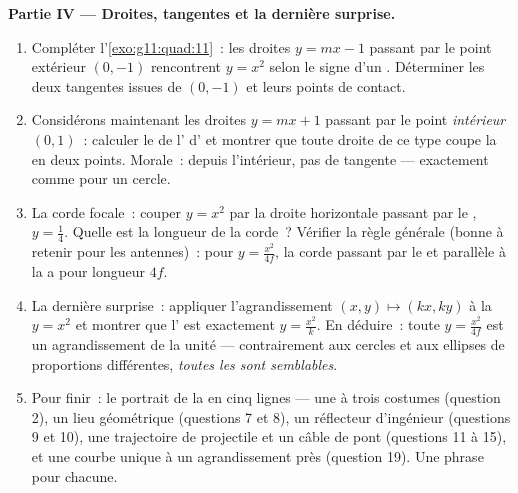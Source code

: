 \begin{problem}
\medskip
\noindent\textbf{Partie IV --- Droites, tangentes et la dernière
surprise.}
\begin{enumerate}[resume]
  \item Compléter l'\cref{exo:g11:quad:11}~: les droites
        $y = mx - 1$ passant par le point extérieur $(0, -1)$
        rencontrent $y = x^2$ selon le signe d'un .
        Déterminer les deux tangentes issues de $(0, -1)$ et leurs
        points de contact.
  \item Considérons maintenant les droites $y = mx + 1$ passant par
        le point \emph{intérieur} $(0, 1)$~: calculer le
         de l' d' et montrer que
        toute droite de ce type coupe la  en deux points.
        Morale~: depuis l'intérieur, pas de tangente --- exactement
        comme pour un cercle.
  \item La corde focale~: couper $y = x^2$ par la droite
        horizontale passant par le , $y = \frac14$. Quelle est
        la longueur de la corde~? Vérifier la règle générale (bonne
        à retenir pour les antennes)~: pour $y = \frac{x^2}{4f}$, la
        corde passant par le  et parallèle à la  a
        pour longueur $4f$.
  \item La dernière surprise~: appliquer l'agrandissement
        $(x, y) \mapsto (kx, ky)$ à la  $y = x^2$ et montrer
        que l' est exactement $y = \frac{x^2}{k}$. En
        déduire~: toute  $y = \frac{x^2}{4f}$ est un
        agrandissement de la  unité --- contrairement aux
        cercles et aux ellipses de proportions différentes,
        \emph{toutes les  sont semblables}.
  \item Pour finir~: le portrait de la  en cinq lignes ---
        une  à trois costumes (question 2), un lieu
        géométrique (questions 7 et 8), un réflecteur d'ingénieur
        (questions 9 et 10), une trajectoire de projectile et un
        câble de pont (questions 11 à 15), et une courbe unique à un
        agrandissement près (question 19). Une phrase pour chacune.
\end{enumerate}
\end{problem}
